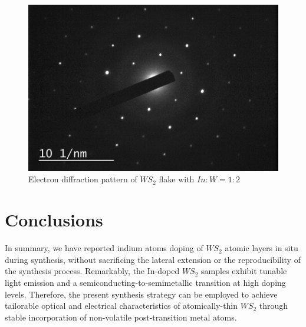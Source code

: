 \begin{figure}[!h]
	\begin{center}
		\includegraphics[scale=0.4]{In/TEMED.png}
		\caption{Electron diffraction pattern of $WS_2$ flake with $In:W = 1:2$}
		\label{fig:InTEMED}
	\end{center}
\end{figure}

\section{Conclusions}

In summary, we have reported indium atoms doping of $WS_2$ atomic layers in situ during synthesis, without sacrificing the lateral extension or the reproducibility of the synthesis process. Remarkably, the In-doped $WS_2$ samples exhibit tunable light emission and a semiconducting-to-semimetallic transition at high doping levels. Therefore, the present synthesis strategy can be employed to achieve tailorable optical and electrical characteristics of atomically-thin $WS_2$ through stable incorporation of non-volatile post-transition metal atoms.
